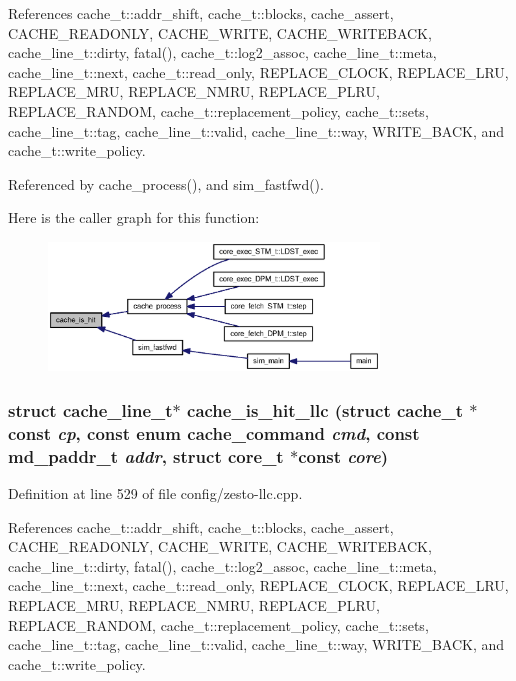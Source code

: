 References cache\_\-t::addr\_\-shift, cache\_\-t::blocks, cache\_\-assert, CACHE\_\-READONLY, CACHE\_\-WRITE, CACHE\_\-WRITEBACK, cache\_\-line\_\-t::dirty, fatal(), cache\_\-t::log2\_\-assoc, cache\_\-line\_\-t::meta, cache\_\-line\_\-t::next, cache\_\-t::read\_\-only, REPLACE\_\-CLOCK, REPLACE\_\-LRU, REPLACE\_\-MRU, REPLACE\_\-NMRU, REPLACE\_\-PLRU, REPLACE\_\-RANDOM, cache\_\-t::replacement\_\-policy, cache\_\-t::sets, cache\_\-line\_\-t::tag, cache\_\-line\_\-t::valid, cache\_\-line\_\-t::way, WRITE\_\-BACK, and cache\_\-t::write\_\-policy.

Referenced by cache\_\-process(), and sim\_\-fastfwd().

Here is the caller graph for this function:\nopagebreak
\begin{figure}[H]
\begin{center}
\leavevmode
\includegraphics[width=249pt]{zesto-cache_8h_bbba2e5ba6186173122bcf1e35dc56eb_icgraph}
\end{center}
\end{figure}
\subsubsection[{cache\_\-is\_\-hit\_\-llc}]{\setlength{\rightskip}{0pt plus 5cm}struct {\bf cache\_\-line\_\-t}$\ast$ cache\_\-is\_\-hit\_\-llc (struct {\bf cache\_\-t} $\ast$const  {\em cp}, \/  const enum {\bf cache\_\-command} {\em cmd}, \/  const {\bf md\_\-paddr\_\-t} {\em addr}, \/  struct {\bf core\_\-t} $\ast$const  {\em core})\hspace{0.3cm}{\tt  [read]}}\label{zesto-cache_8h_4c8a74cb2e996679500e5a9adb9efb5c}




Definition at line 529 of file config/zesto-llc.cpp.

References cache\_\-t::addr\_\-shift, cache\_\-t::blocks, cache\_\-assert, CACHE\_\-READONLY, CACHE\_\-WRITE, CACHE\_\-WRITEBACK, cache\_\-line\_\-t::dirty, fatal(), cache\_\-t::log2\_\-assoc, cache\_\-line\_\-t::meta, cache\_\-line\_\-t::next, cache\_\-t::read\_\-only, REPLACE\_\-CLOCK, REPLACE\_\-LRU, REPLACE\_\-MRU, REPLACE\_\-NMRU, REPLACE\_\-PLRU, REPLACE\_\-RANDOM, cache\_\-t::replacement\_\-policy, cache\_\-t::sets, cache\_\-line\_\-t::tag, cache\_\-line\_\-t::valid, cache\_\-line\_\-t::way, WRITE\_\-BACK, and cache\_\-t::write\_\-policy.
